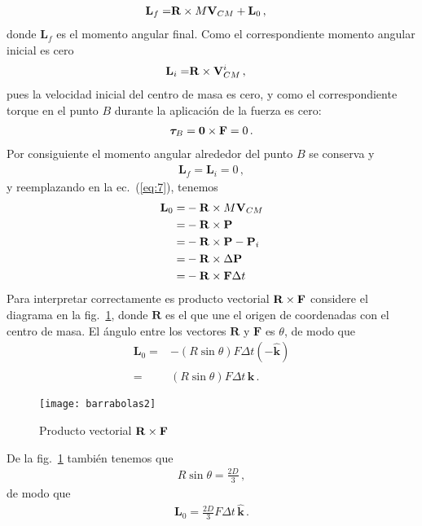 \begin{enumerate}
  \begin{align}
    \label{eq:7}
    \mathbf{L}_f=&\mathbf{R}\times M\mathbf{V}_{CM}+\mathbf{L}_0\,,
  \end{align}
donde $\mathbf{L}_f$ es el momento angular final. Como el correspondiente momento angular inicial es cero
\begin{align}
    \mathbf{L}_i=&\mathbf{R}\times \mathbf{V}_{CM}^i\,,
\end{align}
pues la velocidad inicial del centro de masa es cero, y como el correspondiente torque en el punto $B$ durante la  aplicación de la fuerza es cero:
\begin{align}
  \boldsymbol{\tau}_B=\mathbf{0}\times \mathbf{F}=0\,. 
\end{align}
Por consiguiente el momento angular alrededor del punto $B$ se conserva y
\begin{align}
  \mathbf{L}_f=\mathbf{L}_i=0\,,
\end{align}
y reemplazando en la ec.~(\ref{eq:7}), tenemos
\begin{align}
  \mathbf{L}_0=& -\mathbf{R}\times M\mathbf{V}_{CM}\nonumber\\
=& -\mathbf{R}\times \mathbf{P}\nonumber\\
=& -\mathbf{R}\times \mathbf{P}-\mathbf{P}_i\nonumber\\
=& -\mathbf{R}\times \Delta \mathbf{P}\nonumber\\
=& -\mathbf{R}\times \mathbf{F}\Delta t\nonumber\\
\end{align}
Para interpretar correctamente es producto vectorial $\mathbf{R}\times \mathbf{F}$ considere el diagrama en la fig.~\ref{fig:barrabolas2}, donde $\mathbf{R}$ es el que une el origen de coordenadas con el centro de masa. El ángulo entre los vectores $\mathbf{R}$ y $\mathbf{F}$ es $\theta$, de modo que
\begin{align}
  \mathbf{L}_0=&-(R \sin\theta)F \Delta t(-\hat{\mathbf{k}})\nonumber\\
=&(R \sin\theta)F \Delta t\,\hat{\mathbf{k}}\,.
\end{align}


\begin{figure}
  \centering
  \texttt{[image: barrabolas2]}
  \caption{Producto vectorial $\mathbf{R}\times \mathbf{F}$}
  \label{fig:barrabolas2}
\end{figure}

De la fig.~\ref{fig:barrabolas2} también tenemos que
\begin{align}
  R\sin\theta=\frac{2D}{3}\,,
\end{align}
de modo que
\begin{align}
\label{eq:8}
\mathbf{L}_0= \frac{2D}{3} F\Delta t\,\hat{\mathbf{k}}\,.
\end{align}


\end{enumerate}
